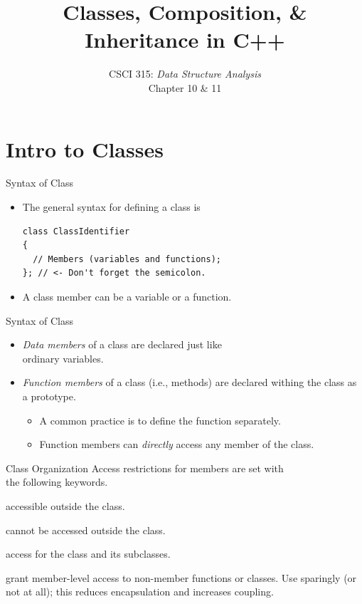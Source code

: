 \documentclass[14pt, aspectratio=1610, hyperref={pdfpagelayout=SinglePage}]{beamer}
\title{\Huge{}Classes, Composition, \& Inheritance in {\ttfamily\bfseries C++}}
\subtitle{CSCI 315: \textit{Data Structure Analysis}\\Chapter 10 \& 11}
\institute{Charleston Southern University}
\begin{document}
\begin{frame}
  \titlepage
\end{frame}

\section{Intro to Classes}


\begin{frame}[fragile]{Syntax of Class}
\begin{itemize}
\item
  The general syntax for defining a class is
\begin{lstlisting}
class ClassIdentifier
{
  // Members (variables and functions);
}; // <- Don't forget the semicolon.
\end{lstlisting}
\item<2->
  A class member can be a variable or a function.
\end{itemize}
\end{frame}

\begin{frame}[fragile]{Syntax of Class}
  \begin{itemize}
  \item<+->
    \emph{Data members} of a class are declared just like\\ ordinary variables.
  \item<+->
    \emph{Function members} of a class (i.e., methods) are declared withing the class as a prototype.
    \begin{itemize}
    \item 
      A common practice is to define the function separately.
    \item
      Function members can \emph{directly} access any member of the class.
    \end{itemize}
  \end{itemize}
\end{frame}

\begin{frame}{Class Organization}
  Access restrictions for members are set with\\ the following keywords.
  \begin{description}[protected~~~~]
  \item[\colorbox{codeBackground}{\texttt{\bfseries\color{codeKeyword}public}}:] accessible outside the class.
  \item[\colorbox{codeBackground}{\texttt{\bfseries\color{codeKeyword}private}}:] cannot be accessed outside the class.
  \item[\colorbox{codeBackground}{\texttt{\bfseries\color{codeKeyword}protected}}:] access for the class and its subclasses.
  \item[\colorbox{codeBackground}{\texttt{\bfseries\color{codeKeyword}friend}}:] grant member-level access to non-member functions or classes. Use sparingly (or not at all); this reduces encapsulation and increases coupling.
  \end{description}
\end{frame}
\end{document}
